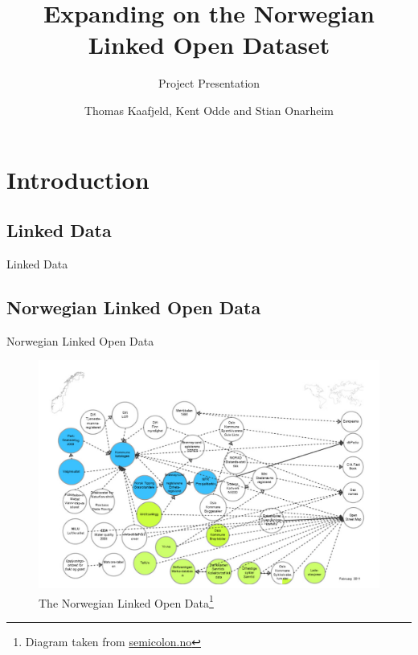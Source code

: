 \documentclass{beamer}
\title{Expanding on the Norwegian Linked Open Dataset} %
\subtitle{Project Presentation} %
\author{Thomas Kaafjeld, Kent Odde and Stian Onarheim}
\begin{document}
\frame{\maketitle}


	\section{Introduction}
	\subsection{Linked Data}

	\begin{frame}{Linked Data}

	\end{frame}

	\subsection{Norwegian Linked Open Data}

	\begin{frame}{Norwegian Linked Open Data}
		\begin{figure}
			\includegraphics[scale=0.19]{resources/norwegian-lod.png}
			\caption{The Norwegian Linked Open Data\footnote[frame]{%
				Diagram taken from \url{semicolon.no} }}
		\end{figure}
	\end{frame}
\end{document}
